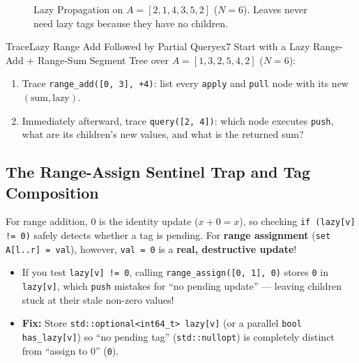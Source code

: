 \documentclass[11pt,a4paper]{article}
\theoremstyle{definition}
\begin{document}
\begin{figure}[htbp]
\caption{Lazy Propagation on $A = [2, 1, 4, 3, 5, 2]$ ($N = 6$). Leaves never need lazy tags because they have no children.}
\label{fig:lazy_propagation}
\end{figure}

\begin{tryitbox}{Trace}{Lazy Range Add Followed by Partial Query}{ex7}
Start with a Lazy Range-Add + Range-Sum Segment Tree over $A = [1, 3, 2, 5, 4, 2]$ ($N = 6$):
\begin{enumerate}[itemsep=2pt, topsep=2pt]
    \item Trace \texttt{range\_add([0, 3], +4)}: list every \texttt{apply} and \texttt{pull} node with its new $(\text{sum}, \text{lazy})$.
    \item Immediately afterward, trace \texttt{query([2, 4])}: which node executes \texttt{push}, what are its children's new values, and what is the returned sum?
\end{enumerate}
\end{tryitbox}

\subsection{The Range-Assign Sentinel Trap and Tag Composition}

\begin{watchoutbox}[Watch Out --- Why \texttt{if (lazy[v] != 0)} Silently Breaks Range Assignment!]
For range addition, $0$ is the identity update ($x + 0 = x$), so checking \texttt{if (lazy[v] != 0)} safely detects whether a tag is pending. For \textbf{range assignment} (\texttt{set A[l..r] = val}), however, \texttt{val = 0} is a \textbf{real, destructive update}!
\begin{itemize}[itemsep=2pt, topsep=2pt]
    \item If you test \texttt{lazy[v] != 0}, calling \texttt{range\_assign([0, 1], 0)} stores \texttt{0} in \texttt{lazy[v]}, which \texttt{push} mistakes for ``no pending update'' --- leaving children stuck at their stale non-zero values!
    \item \textbf{Fix:} Store \texttt{std::optional<int64\_t> lazy[v]} (or a parallel \texttt{bool has\_lazy[v]}) so ``no pending tag'' (\texttt{std::nullopt}) is completely distinct from ``assign to 0'' (\texttt{0}).
\end{itemize}
\end{watchoutbox}
\end{document}
